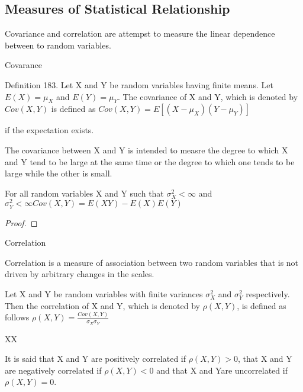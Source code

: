 \subsection{Measures of Statistical Relationship}



Covariance and correlation are attempst to measure the linear dependence between to random variables.

Covarance

\begin{definition}
Definition 183. Let X and Y be random variables having finite means. Let $E\left(X\right)=\mu_{X}$ and $E\left(Y\right)=\mu_{Y}$. The covariance of X and Y, which is denoted by $Cov\left(X,Y\right)$ is defined as $Cov\left(X,Y\right)=E\left[\left(X-\mu_{X}\right)\left(Y-\mu_{Y}\right)\right]$
\end{definition}

if the expectation exists.

The covariance between X and Y is intended to measre the degree to which X and Y tend to be large at the same time or the degree to which one tends to be large while the other is small.

\begin{proposition}
For all random variables X and Y such that $\sigma_{X}^{2}<\infty$ and $\sigma_{Y}^{2}<\infty Cov\left(X,Y\right)=E\left(XY\right)-E\left(X\right)E\left(Y\right)$
\end{proposition}
\begin{proof}
\end{proof}

Correlation

Correlation is a measure of association between two random variables that is not driven by arbitrary changes in the scales.

\begin{definition}
Let X and Y be random variables with finite variances $\sigma_{X}^{2}$ and $\sigma_{Y}^{2}$ respectively. Then the correlation of X and Y, which is denoted by $\rho\left(X,Y\right)$, is defined as follows $\rho\left(X,Y\right)=\frac{Cov\left(X,Y\right)}{\sigma_{X}\sigma_{Y}}$
\end{definition}

XX

\begin{definition}
It is said that X and Y are positively correlated if $\rho\left(X,Y\right)>0$, that X and Y are negatively correlated if $\rho\left(X,Y\right)<0$ and that X and Yare uncorrelated if $\rho\left(X,Y\right)=0$.
\end{definition}

